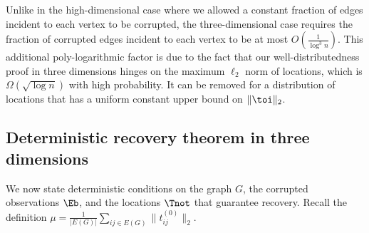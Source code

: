 Unlike in the high-dimensional case where we allowed a constant fraction of edges incident to each
vertex to be corrupted, the three-dimensional case requires the fraction of corrupted edges incident 
to each vertex to be at most $O(\frac{1}{\log^3 n})$.
This additional poly-logarithmic factor is due to the fact that our well-distributedness proof in three dimensions hinges on the maximum $\ell_2$ norm of locations, which is $\Omega(\sqrt{\log n})$ with high probability.
It can be removed for a distribution of locations that has a uniform constant upper bound on $\|\toi\|_2$.


\subsection{Deterministic recovery theorem in three dimensions} \label{sec-deterministic-theorem-three-d}


We now state deterministic conditions on the graph $G$, the corrupted observations $\Eb$, and the locations $\Tnot$ that guarantee recovery.
Recall the definition $\mu=\frac{1}{|E(G)|}\sum_{ij\in E(G)}\|t_{ij}^{(0)}\|_2$. 

